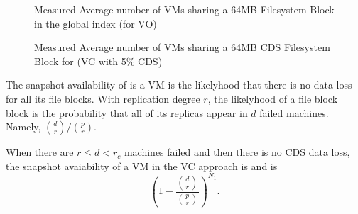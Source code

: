\begin{figure}[ht]
  \centering
  \caption{Measured Average number of VMs sharing a 64MB Filesystem Block in the global index (for VO)}
  \label{fig-vo-fsb-links}
\end{figure}

\begin{figure}[ht]
  \centering
  \caption{Measured Average number of VMs sharing a 64MB CDS Filesystem Block for (VC with 5\% CDS)}
  \label{fig-cds-fsb-links}
\end{figure}


The snapshot availability of is a VM is the likelyhood that
there is no  data loss for all its file blocks.
With replication degree $r$, the likelyhood of
a file block block is the probability that  
all of its replicas appear in $d$ failed machines. 
Namely, $\binom{d}{r}/ \binom{p}{r}$.


When there are $r \le d<r_c$ machines failed and then there is no CDS data loss,  
the snapshot avaiability of a VM in the VC approach is 
and is
\[
(1-\frac{\binom{d}{r}} { \binom{p}{r} })^{N_1}.
\]

